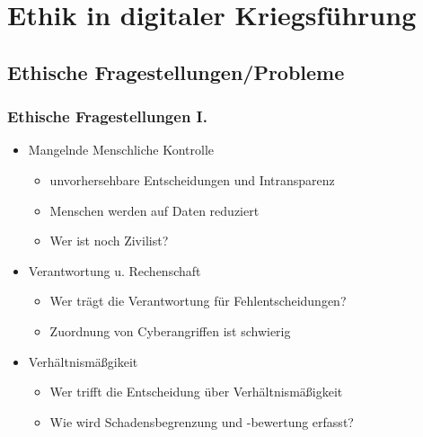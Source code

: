 \documentclass[handout]{beamer}
\begin{document}
\section{Ethik in digitaler Kriegsführung}
\subsection{Ethische Fragestellungen/Probleme}

\begin{frame}
    \frametitle{Ethische Fragestellungen I.}
    \begin{itemize}
        \item Mangelnde Menschliche Kontrolle
        \begin{itemize}
            \item unvorhersehbare Entscheidungen und Intransparenz\cite{d21}
            \item Menschen werden auf Daten reduziert \cite{d21}
            \item Wer ist noch Zivilist? \cite{netzpol}
        \end{itemize}
        \item Verantwortung u. Rechenschaft
        \begin{itemize}
            \item Wer trägt die Verantwortung für Fehlentscheidungen? \cite{d21}
            \item Zuordnung von Cyberangriffen ist schwierig \cite{rowe}
        \end{itemize}
        \item Verhältnismäßgikeit
        \begin{itemize}
            \item Wer trifft die Entscheidung über Verhältnismäßigkeit
            \item Wie wird Schadensbegrenzung und -bewertung erfasst? \cite{rowe}
        \end{itemize}
    \end{itemize}  
\end{frame}
\end{document}
